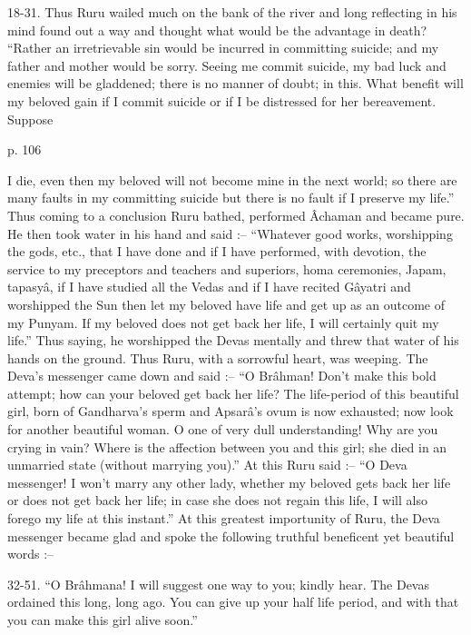  

18-31. Thus Ruru wailed much on the bank of the river and long reflecting in his mind found out a way and thought what would be the advantage in death? “Rather an irretrievable sin would be incurred in committing suicide; and my father and mother would be sorry. Seeing me commit suicide, my bad luck and enemies will be gladdened; there is no manner of doubt; in this. What benefit will my beloved gain if I commit suicide or if I be distressed for her bereavement. Suppose

 

p. 106

 

I die, even then my beloved will not become mine in the next world; so there are many faults in my committing suicide but there is no fault if I preserve my life.” Thus coming to a conclusion Ruru bathed, performed Âchaman and became pure. He then took water in his hand and said :-- “Whatever good works, worshipping the gods, etc., that I have done and if I have performed, with devotion, the service to my preceptors and teachers and superiors, homa ceremonies, Japam, tapasyâ, if I have studied all the Vedas and if I have recited Gâyatri and worshipped the Sun then let my beloved have life and get up as an outcome of my Punyam. If my beloved does not get back her life, I will certainly quit my life.” Thus saying, he worshipped the Devas mentally and threw that water of his hands on the ground. Thus Ruru, with a sorrowful heart, was weeping. The Deva's messenger came down and said :-- “O Brâhman! Don't make this bold attempt; how can your beloved get back her life? The life-period of this beautiful girl, born of Gandharva's sperm and Apsarâ's ovum is now exhausted; now look for another beautiful woman. O one of very dull understanding! Why are you crying in vain? Where is the affection between you and this girl; she died in an unmarried state (without marrying you).” At this Ruru said :-- “O Deva messenger! I won't marry any other lady, whether my beloved gets back her life or does not get back her life; in case she does not regain this life, I will also forego my life at this instant.” At this greatest importunity of Ruru, the Deva messenger became glad and spoke the following truthful beneficent yet beautiful words :--

 

32-51. “O Brâhmana! I will suggest one way to you; kindly hear. The Devas ordained this long, long ago. You can give up your half life period, and with that you can make this girl alive soon.”

